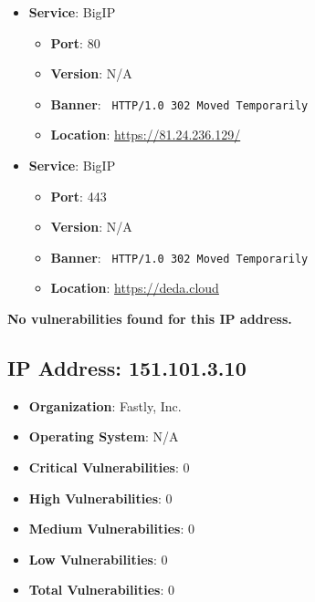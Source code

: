 \documentclass{article}
\begin{document}
\begin{itemize}
    
        \item \textbf{Service}: BigIP
        \begin{itemize}
            \item \textbf{Port}: 80
            \item \textbf{Version}:  N/A 
            \item \textbf{Banner}: \texttt{ HTTP/1.0 302 Moved Temporarily
 }
            \item \textbf{Location}: \href{ https://81.24.236.129/ }{ https://81.24.236.129/ }
        \end{itemize}
    
        \item \textbf{Service}: BigIP
        \begin{itemize}
            \item \textbf{Port}: 443
            \item \textbf{Version}:  N/A 
            \item \textbf{Banner}: \texttt{ HTTP/1.0 302 Moved Temporarily
 }
            \item \textbf{Location}: \href{ https://deda.cloud }{ https://deda.cloud }
        \end{itemize}
    
\end{itemize}


\textbf{No vulnerabilities found for this IP address.}


\clearpage



\subsection*{IP Address: 151.101.3.10}

\begin{itemize}
    \item \textbf{Organization}: Fastly, Inc.
    \item \textbf{Operating System}:  N/A 
    \item \textbf{Critical Vulnerabilities}: 0
    \item \textbf{High Vulnerabilities}: 0
    \item \textbf{Medium Vulnerabilities}: 0
    \item \textbf{Low Vulnerabilities}: 0
    \item \textbf{Total Vulnerabilities}: 0
\end{itemize}
\end{document}
